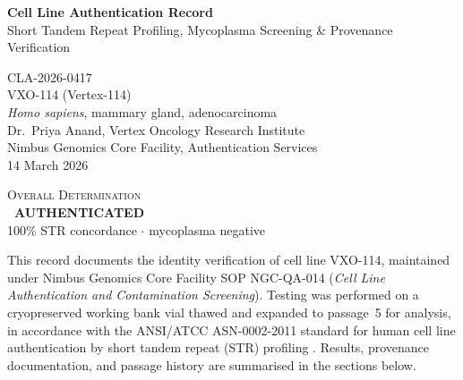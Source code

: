 
\begin{center}
  {\color{labnavy}\fontsize{26}{30}\selectfont\bfseries Cell Line Authentication Record}\\[4pt]
  {\color{labteal}\large Short Tandem Repeat Profiling, Mycoplasma Screening \& Provenance Verification}
\end{center}

\vspace{0.6em}

\noindent
\begin{minipage}[t]{0.62\textwidth}
   CLA-2026-0417 \\{}
   VXO-114 (Vertex-114) \\{}
   \textit{Homo sapiens}, mammary gland, adenocarcinoma \\{}
   Dr.\ Priya Anand, Vertex Oncology Research Institute \\{}
   Nimbus Genomics Core Facility, Authentication Services \\{}
   14 March 2026
\end{minipage}%
\hfill
\begin{minipage}[t]{0.34\textwidth}
  \begin{tcolorbox}[colback=labgreen!12, colframe=labgreen, arc=2pt, boxrule=0.8pt,
                     left=6pt, right=6pt, top=6pt, bottom=6pt, valign=center]
    \centering
    {\small\color{labgray}\textsc{Overall Determination}}\\[3pt]
    {\Large\bfseries\color{labgreen}\faCheckCircle\ AUTHENTICATED}\\[2pt]
    {\footnotesize\color{labgray}100\% STR concordance $\cdot$ mycoplasma negative}
  \end{tcolorbox}
\end{minipage}

\vspace{0.4em}

This record documents the identity verification of cell line VXO-114, maintained under
Nimbus Genomics Core Facility SOP NGC-QA-014 (\textit{Cell Line Authentication and
Contamination Screening}). Testing was performed on a cryopreserved working bank vial
thawed and expanded to passage~5 for analysis, in accordance with the ANSI/ATCC
ASN-0002-2011 standard for human cell line authentication by short tandem repeat (STR)
profiling \cite{ansi_atcc_asn0002}. Results, provenance documentation, and passage history
are summarised in the sections below.
